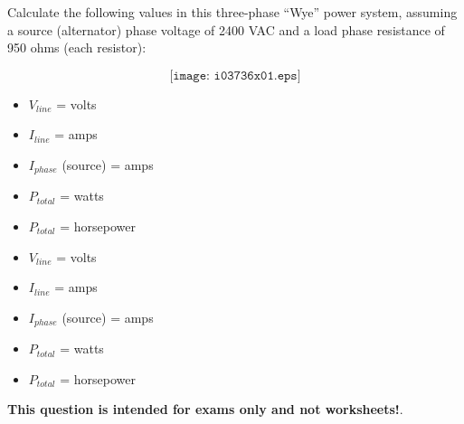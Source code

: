 

Calculate the following values in this three-phase ``Wye'' power system, assuming a source (alternator) phase voltage of 2400 VAC and a load phase resistance of 950 ohms (each resistor):

$$\texttt{[image: i03736x01.eps]}$$

\begin{itemize}
\item{} $V_{line}$ = \underbar{\hskip 50pt} volts
\vskip 10pt
\item{} $I_{line}$ = \underbar{\hskip 50pt} amps
\vskip 10pt
\item{} $I_{phase}$ (source) = \underbar{\hskip 50pt} amps
\vskip 10pt
\item{} $P_{total}$ = \underbar{\hskip 50pt} watts  
\vskip 10pt
\item{} $P_{total}$ = \underbar{\hskip 50pt} horsepower 
\end{itemize}







\begin{itemize}
\item{} $V_{line}$ =  volts
\vskip 10pt
\item{} $I_{line}$ =  amps
\vskip 10pt
\item{} $I_{phase}$ (source) =  amps
\vskip 10pt
\item{} $P_{total}$ =  watts  
\vskip 10pt
\item{} $P_{total}$ =  horsepower 
\end{itemize}








{\bf This question is intended for exams only and not worksheets!}.


